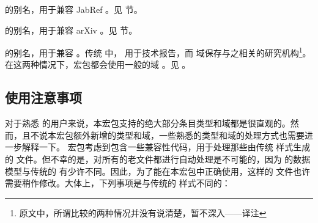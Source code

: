 \begin{fieldlist}

 的别名，用于兼容 JabRef 。见  节。




 的别名，用于兼容 arXiv 。见  节。




 的别名，用于兼容 \BibTeX 。传统 \BibTeX 中， 用于技术报告，而  域保存与之相关的研究机构\footnote{原文中，所谓比较的两种情况并没有说清楚，暂不深入——译注}。
在这两种情况下，\biblatex 宏包都会使用一般的域 。见 。

\end{fieldlist}

\subsection{使用注意事项}
\label{bib:use}

对于熟悉 \BibTeX 的用户来说，本宏包支持的绝大部分条目类型和域都是很直观的。然而，且不说本宏包额外新增的类型和域，一些熟悉的类型和域的处理方式也需要进一步解释一下。
宏包考虑到包含一些兼容性代码，用于处理那些由传统 \BibTeX 样式生成的  文件。但不幸的是，对所有的老文件都进行自动处理是不可能的，因为 \biblatex 的数据模型与传统的 \BibTeX 有少许不同。因此，为了能在本宏包中正确使用，这样的  文件也许需要稍作修改。大体上，下列事项是与传统的 \BibTeX 样式不同的：

